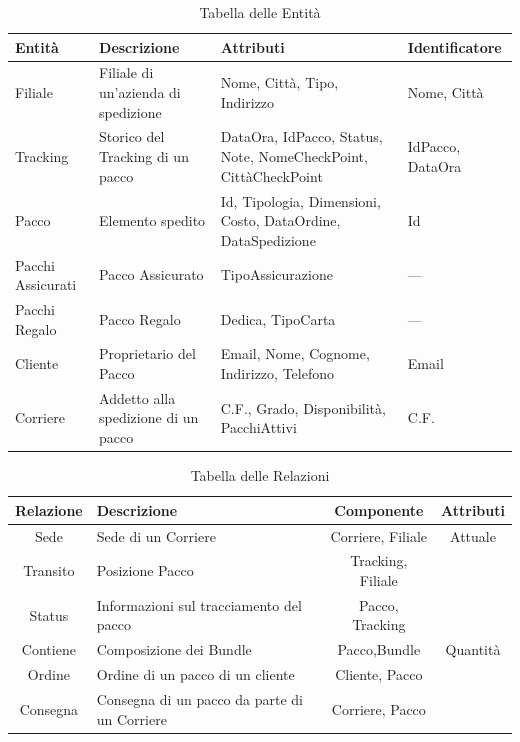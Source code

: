 \begin{table}[H]
    \centering
    \begin{tabular}{p{2.5cm} p{4cm} p{5cm} p{3cm}}
    \toprule
    \textbf{Entità} & \textbf{Descrizione} & \textbf{Attributi} & \textbf{Identificatore} \\
    \midrule
    Filiale         & Filiale di un'azienda di spedizione & Nome, Città, Tipo, Indirizzo & Nome, Città \\
    
    Tracking        & Storico del Tracking di un pacco & DataOra, IdPacco, Status, Note, NomeCheckPoint, CittàCheckPoint & IdPacco, DataOra \\
    
    Pacco           & Elemento spedito & Id, Tipologia, Dimensioni, Costo, DataOrdine, DataSpedizione & Id \\
    
    Pacchi Assicurati & Pacco Assicurato & TipoAssicurazione & — \\
    
    Pacchi Regalo   & Pacco Regalo & Dedica, TipoCarta & — \\
    
    Cliente         & Proprietario del Pacco & Email, Nome, Cognome, Indirizzo, Telefono & Email \\
    
    Corriere        & Addetto alla spedizione di un pacco & C.F., Grado, Disponibilità, PacchiAttivi & C.F. \\
    \bottomrule
    \end{tabular}
    \caption{Tabella delle Entità}
    \label{tab:entità}
\end{table}

\begin{table}[H]
    \centering
    \begin{tabular}{clcc}
    \toprule
    \textbf{Relazione} & \textbf{Descrizione} & \textbf{Componente} & \textbf{Attributi}  \\ [0.5ex] 
    \midrule
        Sede & Sede di un Corriere & Corriere, Filiale & Attuale\\
        Transito & Posizione Pacco & Tracking, Filiale & \\
        Status & Informazioni sul tracciamento del pacco & Pacco, Tracking & \\
        Contiene & Composizione dei Bundle & Pacco,Bundle & Quantità \\
        Ordine & Ordine di un pacco di un cliente & Cliente, Pacco &  \\
        Consegna & Consegna di un pacco da parte di un Corriere & Corriere, Pacco & \\
        \bottomrule
    \end{tabular}
    \caption{Tabella delle Relazioni}
    \label{tab:relzioni}
\end{table}



